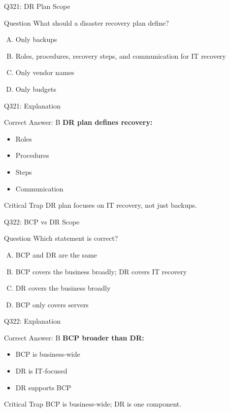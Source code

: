 \documentclass{beamer}
\begin{document}
	\begin{frame}{Q321: DR Plan Scope}
		\begin{block}{Question}
			What should a disaster recovery plan define?
		\end{block}
		\begin{enumerate}[(A)]
			\item Only backups
			\item Roles, procedures, recovery steps, and communication for IT recovery
			\item Only vendor names
			\item Only budgets
		\end{enumerate}
	\end{frame}
	
	\begin{frame}{Q321: Explanation}
		\begin{block}{Correct Answer: B}
			\textbf{DR plan defines recovery:}
			\begin{itemize}
				\item Roles
				\item Procedures
				\item Steps
				\item Communication
			\end{itemize}
		\end{block}
		\begin{alertblock}{Critical Trap}
			DR plan focuses on IT recovery, not just backups.
		\end{alertblock}
	\end{frame}
	
	\begin{frame}{Q322: BCP vs DR Scope}
		\begin{block}{Question}
			Which statement is correct?
		\end{block}
		\begin{enumerate}[(A)]
			\item BCP and DR are the same
			\item BCP covers the business broadly; DR covers IT recovery
			\item DR covers the business broadly
			\item BCP only covers servers
		\end{enumerate}
	\end{frame}
	
	\begin{frame}{Q322: Explanation}
		\begin{block}{Correct Answer: B}
			\textbf{BCP broader than DR:}
			\begin{itemize}
				\item BCP is business-wide
				\item DR is IT-focused
				\item DR supports BCP
			\end{itemize}
		\end{block}
		\begin{alertblock}{Critical Trap}
			BCP is business-wide; DR is one component.
		\end{alertblock}
	\end{frame}
	
\end{document}
